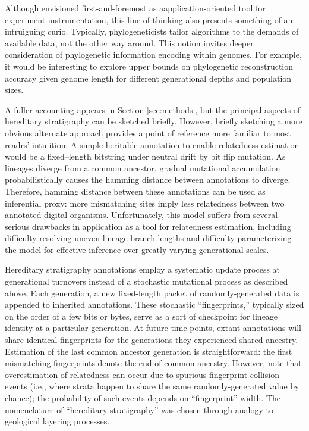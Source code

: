 Although envisioned first-and-foremost as aapplication-oriented tool for experiment instrumentation, this line of thinking also presents something of an intruiguing curio.
Typically, phylogeneticists tailor algorithms to the demands of available data, not the other way around.
This notion invites deeper consideration of phylogenetic information encoding within genomes.
For example, it would be interesting to explore upper bounds on phylogenetic reconstruction accuracy given genome length for different generational depths and population sizes.

A fuller accounting appears in Section \ref{sec:methods}, but the principal aspects of hereditary stratigraphy can be sketched briefly.
However, briefly sketching a more obvious alternate approach provides a point of reference more familiar to most readrs' intuiition.
A simple heritable annotation to enable relatedness estimation would be a fixed--length bitstring under neutral drift by bit flip mutation.
As lineages diverge from a common ancestor, gradual mutational accumulation probabilistically causes the hamming distance between annotations to diverge.
Therefore, hamming distance between these annotations can be used as inferential proxy: more mismatching sites imply less relatedness between two annotated digital organisms.
Unfortunately, this model suffers from several serious drawbacks in application as a tool for relatedness estimation, including difficulty resolving uneven lineage branch lengths and difficulty parameterizing the model for effective inference over greatly varying generational scales.

Hereditary stratigraphy annotations employ a systematic update process at generational turnovers instead of a stochastic mutational process as described above.
Each generation, a new fixed-length packet of randomly-generated data is appended to inherited annotations.
These stochastic ``fingerprints,'' typically sized on the order of a few bits or bytes, serve as a sort of checkpoint for lineage identity at a particular generation.
At future time points, extant annotations will share identical fingerprints for the generations they experienced shared ancestry.
Estimation of the last common ancestor generation is straightforward: the first mismatching fingerprints denote the end of common ancestry.
However, note that overestimation of relatedness can occur due to spurious fingerprint collision events (i.e., where strata happen to share the same randomly-generated value by chance); the probability of such events depends on ``fingerprint'' width.
The nomenclature of ``hereditary stratigraphy'' was chosen through analogy to geological layering processes.

